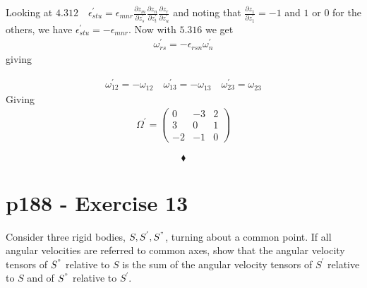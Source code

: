Looking at $\mathbf{4.312} \quad \epsilon_{stu}^{'} = \epsilon_{mnr}^{} \frac{\partial z_m}{\partial z_s^{'}}\frac{\partial z_n}{\partial z_t^{'}}\frac{\partial z_r^{}}{\partial z_u^{'}}$ and noting that $\frac{\partial z_1}{\partial z_1^{'}}=-1$ and $1$ or $0$ for the others, we have
$\epsilon_{stu}^{'} = -\epsilon_{mnr}^{}$.
Now with $\mathbf{5.316}$ we get
\begin{align}
 \omega_{rs}^{'}=-\epsilon_{rsn}\omega_{n}^{'}
 \end{align}
 giving
 
 \begin{align}
 \omega_{12}^{'}= -\omega_{12}^{}\quad\omega_{13}^{'}= -\omega_{13}^{}\quad\omega_{23}^{'}= \omega_{23}^{}
 \end{align}
 Giving
 \begin{align}
\Omega^{'} =\left( \begin{matrix}
0&-3&2\\
3&0&1\\
-2&-1&0
\end{matrix}\right)
\end{align}
 
$$\blacklozenge$$
\newpage

\section{p188 - Exercise 13}
\begin{tcolorbox}
Consider three rigid bodies, $S,S^{'}, S^{"}$, turning about a common point. If all angular velocities are referred to common axes, show that the angular velocity tensors of $S^{"}$ relative to $S$ is the sum of the angular velocity tensors of $S^{'}$ relative to $S$ and of  $S^{"}$ relative to $S^{'}$.
\end{tcolorbox} 

